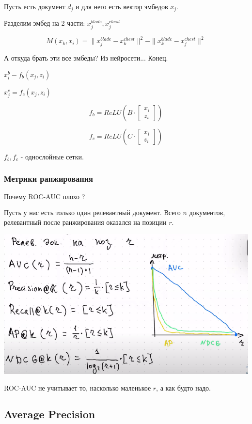 \documentclass[12pt]{article}
\begin{document}
Пусть есть документ $d_j$ и для него есть вектор эмбедов $x_j$.

Разделим эмбед на 2 части: $x_j^{blade}, x_j^{chest}$

\[ M(x_k, x_i) = \|x_j^{blade} - x_k^{chest}\|^2 - \|x_k^{blade} - x_j^{chest}\|^2 \]

А откуда брать эти все эмбеды? Из нейросети... Конец.

$x_i^b - f_b(x_j, z_i)$

$x_j^c = f_c(x_j, z_i)$

\[ f_b = ReLU \left( B \cdot \begin{bmatrix} x_i \\ z_i \end{bmatrix} \right) \]

\[ f_c = ReLU \left( C \cdot \begin{bmatrix} x_i \\ z_i \end{bmatrix} \right) \]

$f_b, f_c$ - однослойные сетки.

\subsubsection*{Метрики ранжирования}

Почему ROC-AUC плохо ?


Пусть у нас есть только один релевантный документ. Всего $n$ документов, релевантный после ранжирования оказался на позиции $r$.

\includegraphics[width=14cm]{metrics.png}

ROC-AUC не учитывает то, насколько маленькое $r$, а как будто надо.

\subsection*{Average Precision}
\end{document}
